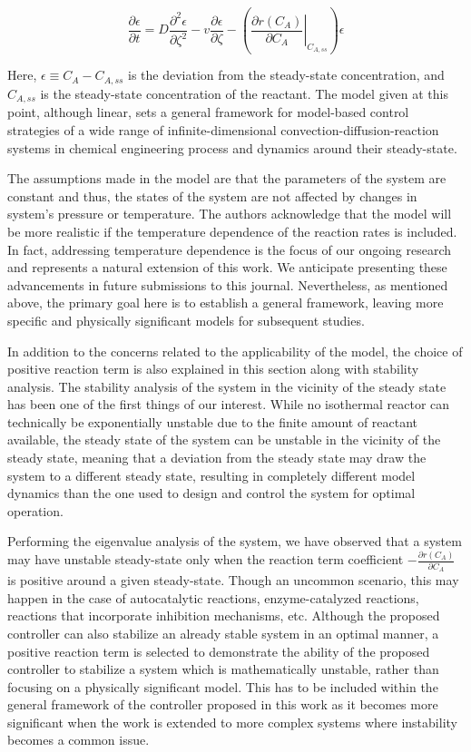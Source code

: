 \documentclass[12pt,answers]{exam}
\begin{document}
\begin{equation}
    \frac{\partial \epsilon}{\partial t} = D \frac{\partial^2 \epsilon}{\partial \zeta^2} - v \frac{\partial \epsilon}{\partial \zeta} - \left( \left. \frac{\partial r(C_A)}{\partial C_A} \right|_{C_{A, ss}} \right) \epsilon
\end{equation}

Here, $\epsilon \equiv C_A - C_{A, ss}$ is the deviation from the steady-state concentration, and $C_{A, ss}$ is the steady-state concentration of the reactant. The model given at this point, although linear, sets a general framework for model-based control strategies of a wide range of infinite-dimensional convection-diffusion-reaction systems in chemical engineering process and dynamics around their steady-state.

The assumptions made in the model are that the parameters of the system are constant and thus, the states of the system are not affected by changes in system's pressure or temperature. The authors acknowledge that the model will be more realistic if the temperature dependence of the reaction rates is included. In fact, addressing temperature dependence is the focus of our ongoing research and represents a natural extension of this work. We anticipate presenting these advancements in future submissions to this journal. Nevertheless, as mentioned above, the primary goal here is to establish a general framework, leaving more specific and physically significant models for subsequent studies.

In addition to the concerns related to the applicability of the model, the choice of positive reaction term is also explained in this section along with stability analysis. The stability analysis of the system in the vicinity of the steady state has been one of the first things of our interest. While no isothermal reactor can technically be exponentially unstable due to the finite amount of reactant available, the steady state of the system can be unstable in the vicinity of the steady state, meaning that a deviation from the steady state may draw the system to a different steady state, resulting in completely different model dynamics than the one used to design and control the system for optimal operation.

Performing the eigenvalue analysis of the system, we have observed that a system may have unstable steady-state only when the reaction term coefficient $-\frac{\partial r(C_A)}{\partial C_A}$ is positive around a given steady-state. Though an uncommon scenario, this may happen in the case of autocatalytic reactions, enzyme-catalyzed reactions, reactions that incorporate inhibition mechanisms, etc. Although the proposed controller can also stabilize an already stable system in an optimal manner, a positive reaction term is selected to demonstrate the ability of the proposed controller to stabilize a system which is mathematically unstable, rather than focusing on a physically significant model. This has to be included within the general framework of the controller proposed in this work as it becomes more significant when the work is extended to more complex systems where instability becomes a common issue.
\end{document}
